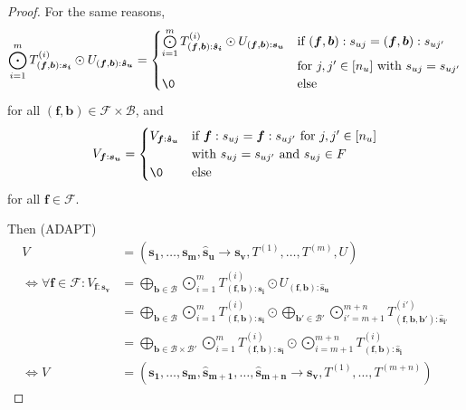 \begin{proof}
    For the same reasons,
    $$\bigodot\limits_{i = 1}^{m} T^{(i)}_{(\bm{f}, \bm{b}): \bm{s_i}} \odot U_{(\bm{f}, \bm{b}): \bm{\hat{s}_u}} = \begin{cases}
            \bigodot\limits_{i = 1}^{m} T^{(i)}_{(\bm{f}, \bm{b}): \bm{\hat{s}_i}} \odot U_{(\bm{f}, \bm{b}): \bm{s_u}} & \text{if } (\bm{f}, \bm{b}):s_{uj} = (\bm{f}, \bm{b}):s_{uj'} \\
                                                                                                                        & \text{for } j,j' \in [n_u] \text{ with } s_{uj} = s_{uj'}     \\
            \0                                                                                                          & \text{else}
        \end{cases}$$
    for all $(\bm{f}, \bm{b}) \in \mathcal{F} \times \mathcal{B}$, and
    $$V_{\bm{f}: \bm{s_u}} = \begin{cases}
            V_{\bm{f}: \bm{\hat{s}_u}} & \text{if } \bm{f}:s_{uj} = \bm{f}:s_{uj'} \text{ for } j,j' \in [n_u] \\
                                 & \text{with } s_{uj} = s_{uj'} \text{ and } s_{uj} \in F               \\
            \0                   & \text{else}
        \end{cases}$$
    for all $\bm{f} \in \mathcal{F}$.

    Then (ADAPT)
    \begin{align*}
        V                                                         & = (\bm{s_1},\dots,\bm{s_m}, \bm{\hat{s}_u} \rightarrow \bm{s_v}, T^{(1)},\dots,T^{(m)}, U)                                                                                                                                                                \\
        \iff \forall \bm{f} \in \mathcal{F}: V_{\bm{f}: \bm{s_v}} & = \bigoplus\limits_{\bm{b} \in \mathcal{B}} \bigodot\limits_{i = 1}^{m} T^{(i)}_{(\bm{f}, \bm{b}):\bm{s_i}} \odot U_{(\bm{f}, \bm{b}):\bm{\hat{s}_u}}                                                                                                     \\
                                                                  & = \bigoplus\limits_{\bm{b} \in \mathcal{B}} \bigodot\limits_{i = 1}^{m} T^{(i)}_{(\bm{f}, \bm{b}):\bm{s_i}} \odot \bigoplus\limits_{\bm{b'} \in \mathcal{B}'} \bigodot\limits_{i' = m + 1}^{m + n} T^{(i')}_{(\bm{f}, \bm{b}, \bm{b'}):\bm{\hat{s}_{i'}}} \\
                                                                  & = \bigoplus\limits_{\bm{b} \in \mathcal{B} \times \mathcal{B}'} \bigodot\limits_{i = 1}^{m} T^{(i)}_{(\bm{f}, \bm{b}):\bm{s_i}} \odot \bigodot\limits_{i = m + 1}^{m + n} T^{(i)}_{(\bm{f}, \bm{b}):\bm{\hat{s}_i}}                                       \\
        \iff V                                                    & = (\bm{s_1}, \dots, \bm{s_m}, \bm{\hat{s}_{m + 1}}, \dots, \bm{\hat{s}_{m + n}} \rightarrow \bm{s_v}, T^{(1)}, \dots, T^{(m + n)})
    \end{align*}
\end{proof}